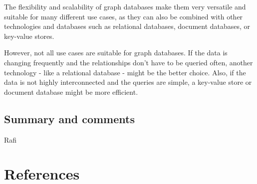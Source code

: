 \documentclass[english,smartquotes,apa]{hgbreport}
\begin{document}
The flexibility and scalability of graph databases make them very versatile and suitable for many different use cases, as they can also be combined with other technologies and databases such as relational databases, document databases, or key-value stores.

However, not all use cases are suitable for graph databases. If the data is changing frequently and the relationships don't have to be queried often, another technology - like a relational database - might be the better choice. Also, if the data is not highly interconnected and the queries are simple, a key-value store or document database might be more efficient. 


\section*{Summary and comments}

Rafi


  
\chapter{References}

\printbibliography[heading=noheader]

\end{document}
